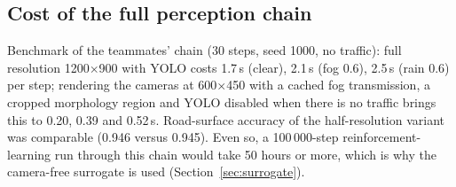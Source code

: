 \subsection{Cost of the full perception chain}
Benchmark of the teammates' chain (30 steps, seed 1000, no traffic): full resolution 1200$\times$900 with YOLO costs 1.7\,s (clear), 2.1\,s (fog 0.6), 2.5\,s (rain 0.6) per step; rendering the cameras at 600$\times$450 with a cached fog transmission, a cropped morphology region and YOLO disabled when there is no traffic
brings this to 0.20, 0.39 and 0.52\,s. Road-surface accuracy of the half-resolution variant was comparable (0.946 versus 0.945). Even so, a 100\,000-step reinforcement-learning run through this chain would take 50 hours or more, which is why the camera-free surrogate is used (Section~\ref{sec:surrogate}).

